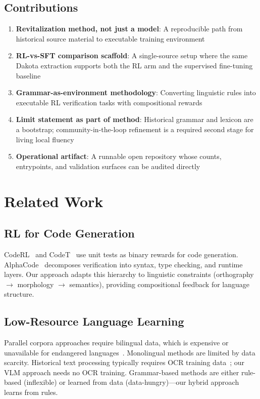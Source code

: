 \documentclass{article}
\begin{document}
\subsection{Contributions}

\begin{enumerate}
    \item \textbf{Revitalization method, not just a model}: A reproducible path from historical source material to executable training environment
    \item \textbf{RL-vs-SFT comparison scaffold}: A single-source setup where the same Dakota extraction supports both the RL arm and the supervised fine-tuning baseline
    \item \textbf{Grammar-as-environment methodology}: Converting linguistic rules into executable RL verification tasks with compositional rewards
    \item \textbf{Limit statement as part of method}: Historical grammar and lexicon are a bootstrap; community-in-the-loop refinement is a required second stage for living local fluency
    \item \textbf{Operational artifact}: A runnable open repository whose counts, entrypoints, and validation surfaces can be audited directly
\end{enumerate}

\section{Related Work}

\subsection{RL for Code Generation}

CodeRL~\cite{le2022coderl} and CodeT~\cite{chen2023codet} use unit tests as binary rewards for code generation. AlphaCode~\cite{li2022competition} decomposes verification into syntax, type checking, and runtime layers. Our approach adapts this hierarchy to linguistic constraints (orthography $\rightarrow$ morphology $\rightarrow$ semantics), providing compositional feedback for language structure.

\subsection{Low-Resource Language Learning}

Parallel corpora approaches require bilingual data, which is expensive or unavailable for endangered languages~\cite{joshi2020state}. Monolingual methods are limited by data scarcity. Historical text processing typically requires OCR training data~\cite{hill2019empirical}; our VLM approach needs no OCR training. Grammar-based methods are either rule-based (inflexible) or learned from data (data-hungry)---our hybrid approach learns from rules.
\end{document}
